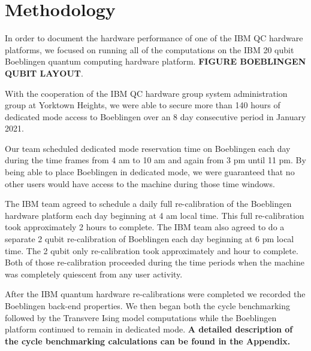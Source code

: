 
\section{Methodology}

In order to document the hardware performance of one of the IBM QC hardware platforms, we focused on running all of the computations on the IBM 20 qubit Boeblingen quantum computing hardware platform.  \textbf{FIGURE BOEBLINGEN QUBIT LAYOUT}.    


With the cooperation of the IBM QC hardware group system administration group at Yorktown Heights, we were able to secure more than 140 hours of dedicated mode access to Boeblingen over an 8 day consecutive period in January 2021.  

Our team scheduled dedicated mode reservation time on Boeblingen each day during the time frames from 4 am to 10 am and again from 3 pm until 11 pm.  By being able to place Boeblingen in dedicated mode, we were guaranteed that no other users would have access to the machine during those time windows.  

The IBM team agreed to schedule a daily full re-calibration of the Boeblingen hardware platform each day beginning at 4 am local time.  This full re-calibration took approximately 2 hours to complete.  The IBM team also agreed to do a separate 2 qubit re-calibration of Boeblingen each day beginning at 6 pm local time.  The 2 qubit only re-calibration took approximately and hour to complete.  Both of those re-calibration proceeded during the time periods when the machine was completely quiescent from any user activity. 

After the IBM quantum hardware re-calibrations were completed we recorded the Boeblingen back-end properties.  We then began both the cycle benchmarking followed by the Transvere Ising model computations while the Boeblingen platform continued to remain in dedicated mode.  \textbf{A detailed description of the cycle benchmarking calculations can be found in the Appendix.}

